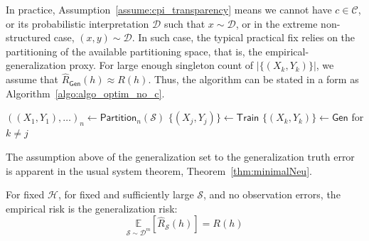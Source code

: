 In practice, Assumption~\ref{assume:cpi_transparency} means we cannot have $c\in\mathcal{C}$, or its probabilistic interpretation $\mathcal{D}$ such that $x\sim\mathcal{D}$, or in the extreme non-structured case, $(x,y)\sim \mathcal{D}$. In such case, the typical practical fix relies on the partitioning of the available partitioning space, that is, the empirical-generalization proxy. For large enough singleton count of $|\{(X_{k},Y_{k})\}|$, we assume that $\hat{R}_{\mathsf{Gen}}(h)\approx R(h)$. Thus, the algorithm can be stated in a form as Algorithm~\ref{algo:algo_optim_no_c}.

\begin{algorithm}[htb]
    \renewcommand{\algorithmcfname}{Optimization problem}
    \caption{Empirical-generalization learning dynamics (proxy)}
    \Begin
    {
        $((X_{1},Y_{1}),\dots)_{n}\gets\mathsf{Partition}_{n}(\mathcal{S})$\;
        $\{(X_{j},Y_{j})\}\gets \mathsf{Train}$\;
        $\{(X_{k},Y_{k})\}\gets \mathsf{Gen}$ for $k\ne j$\;
    }
    \label{algo:algo_optim_no_c}
\end{algorithm}
The assumption above of the generalization set to the generalization truth error is apparent in the usual system theorem, Theorem~\ref{thm:minimalNeu}.
\begin{theorem}[\cite{10.5555/2371238}]\label{thm:minimalNeu}
    For fixed $\mathcal{H}$, for fixed and sufficiently large $\mathcal{S}$, and no observation errors, the empirical risk is the generalization risk: \begin{equation}
        \underset{\mathcal{S}\sim \mathcal{D}^{m}}{\mathbb{E}}[\hat{R}_{\mathcal{S}}(h)]  = R(h)
    \end{equation} 
\end{theorem}

